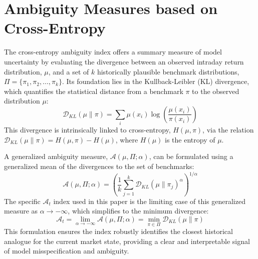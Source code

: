 \documentclass[preprint,12pt,authoryear]{elsarticle}
\begin{document}



\clearpage
\appendix

\section{Ambiguity Measures based on Cross-Entropy}
The cross-entropy ambiguity index offers a summary measure of model uncertainty by evaluating the divergence between an observed intraday return distribution, $\mu$, and a set of $k$ historically plausible benchmark distributions, $\Pi = \{\pi_1, \pi_2, \dots, \pi_k\}$. Its foundation lies in the Kullback-Leibler (KL) divergence, which quantifies the statistical distance from a benchmark $\pi$ to the observed distribution $\mu$:
\begin{equation}
    \mathcal{D}_{KL}(\mu \| \pi) = \sum_{i} \mu(x_i) \log\left(\frac{\mu(x_i)}{\pi(x_i)}\right)
\end{equation}
This divergence is intrinsically linked to cross-entropy, $H(\mu, \pi)$, via the relation $\mathcal{D}_{KL}(\mu \| \pi) = H(\mu, \pi) - H(\mu)$, where $H(\mu)$ is the entropy of $\mu$.

A generalized ambiguity measure, $\mathcal{A}(\mu, \Pi; \alpha)$, can be formulated using a generalized mean of the divergences to the set of benchmarks:
\begin{equation}
    \mathcal{A}(\mu, \Pi; \alpha) = \left( \frac{1}{k} \sum_{j=1}^{k} \mathcal{D}_{KL}(\mu \| \pi_j)^{\alpha} \right)^{1/\alpha}
\end{equation}
The specific $\mathcal{A}_t$ index used in this paper is the limiting case of this generalized measure as $\alpha \to -\infty$, which simplifies to the minimum divergence:
\begin{equation}
    \mathcal{A}_t = \lim_{\alpha \to -\infty} \mathcal{A}(\mu, \Pi; \alpha) = \min_{\pi \in \Pi} \mathcal{D}_{KL}(\mu \| \pi)
\end{equation}
This formulation ensures the index robustly identifies the closest historical analogue for the current market state, providing a clear and interpretable signal of model misspecification and ambiguity.
\end{document}

